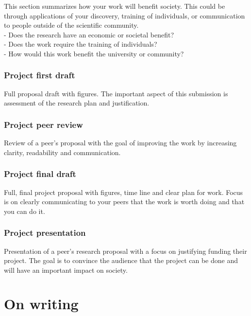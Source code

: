 \documentclass[11pt,]{article}
\begin{document}
This section summarizes how your work will benefit society. This could
be through applications of your discovery, training of individuals, or
communication to people outside of the scientific community.\\
- Does the research have an economic or societal benefit?\\
- Does the work require the training of individuals?\\
- How would this work benefit the university or community?

\subsubsection{Project first draft}\label{project-first-draft}

Full proposal draft with figures. The important aspect of this
submission is assessment of the research plan and justification.

\subsubsection{Project peer review}\label{project-peer-review}

Review of a peer's proposal with the goal of improving the work by
increasing clarity, readability and communication.

\subsubsection{Project final draft}\label{project-final-draft}

Full, final project proposal with figures, time line and clear plan for
work. Focus is on clearly communicating to your peers that the work is
worth doing and that you can do it.

\subsubsection{Project presentation}\label{project-presentation}

Presentation of a peer's research proposal with a focus on justifying
funding their project. The goal is to convince the audience that the
project can be done and will have an important impact on society.

\section{On writing}\label{on-writing}
\end{document}
